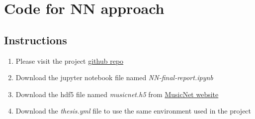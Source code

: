 \chapter{Code for NN approach}
\label{append:neural-networks}

\section{Instructions}
\begin{enumerate}
    \item Please visit the project \href{https://github.com/OliverIgnetik/engn4200_thesis}{github repo}
    \item Download the jupyter notebook file named \emph{NN-final-report.ipynb}
    \item Download the hdf5 file named \emph{musicnet.h5} from \href{https://homes.cs.washington.edu/~thickstn/musicnet.html}{MusicNet website}
    \item Download the \emph{thesis.yml} file to use the same environment used in the project
\end{enumerate}

